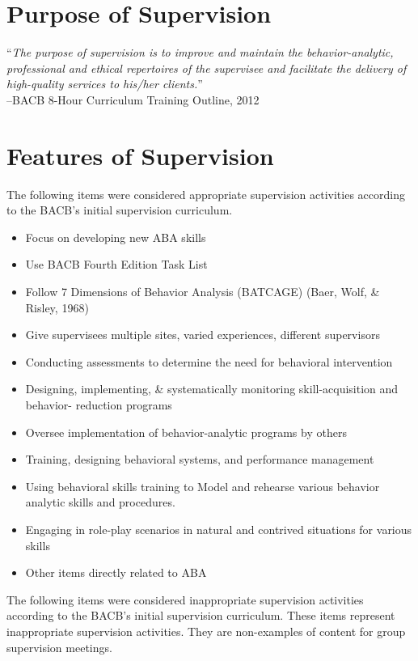 \section{Purpose of Supervision}
\begin{displayquote}
``\textit{The purpose of supervision is to improve and maintain the behavior-analytic, professional and ethical repertoires of the supervisee and facilitate the delivery of high-quality services to his/her clients.}''\\
--BACB\textregistered{}{} 8-Hour Curriculum Training Outline, 2012
\end{displayquote}
\section{Features of Supervision}
The following items were considered appropriate supervision activities according to the BACB's initial supervision curriculum.
\begin{itemize}
\item Focus on developing new ABA skills
\item Use BACB\textregistered{}{} Fourth Edition Task List
\item Follow 7 Dimensions of Behavior Analysis (BATCAGE) (Baer, Wolf, \& Risley, 1968)
\item Give supervisees multiple sites, varied experiences, different supervisors
\item Conducting assessments to determine the need for behavioral intervention
\item Designing, implementing, \& systematically monitoring skill-acquisition and behavior- reduction programs
\item Oversee implementation of behavior-analytic programs by others
\item Training, designing behavioral systems, and performance management
\item Using behavioral skills training to Model and rehearse various behavior analytic skills and procedures.
\item Engaging in role-play scenarios in natural and contrived situations for various skills
\item Other items directly related to ABA
\end{itemize}

The following items were considered inappropriate supervision activities according to the BACB's initial supervision curriculum. These items represent inappropriate supervision activities. They are non-examples of content for group supervision meetings.

